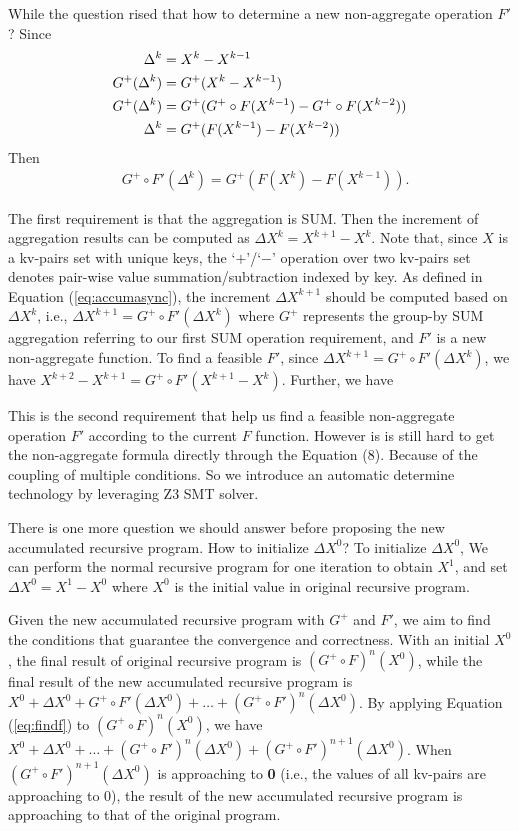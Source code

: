 {While the question rised that how to determine a new non-aggregate operation $F'$? Since
	\begin{equation}
	\label{eq:inferr}
	\begin{aligned}
	\Delta^k&=X^k-X^{k-1}\\
	G^+(\Delta^{k})&=G^+(X^k-X^{k-1})\\
	G^+(\Delta^{k})&=G^+(G^+\circ F(X^{k-1})-G^+\circ F(X^{k-2}))\\
	\Delta^{k}&=G^+(F(X^{k-1})-F(X^{k-2}))\notag
	\end{aligned}
	\end{equation}
	Then
	\begin{equation}
	\label{eq:findf}
	\begin{aligned}
	&G^+\circ F'(\Delta^{k})=G^+(F(X^{k})-F(X^{k-1})).
	\end{aligned}
	\end{equation}
}

{\color{green}
	The first requirement is that the aggregation is SUM. Then the increment of aggregation results can be computed as $\Delta X^k=X^{k+1}-X^k$. Note that, since $X$ is a kv-pairs set with unique keys, the `$+$'/`$-$' operation over two kv-pairs set denotes pair-wise value summation/subtraction indexed by key. As defined in Equation (\ref{eq:accumasync}), the increment $\Delta X^{k+1}$ should be computed based on $\Delta X^k$, i.e., $\Delta X^{k+1}=G^{+}\circ F'(\Delta X^k)$ where $G^{+}$ represents the group-by SUM aggregation referring to our first SUM operation requirement, and $F'$ is a new non-aggregate function. To find a feasible $F'$, since $\Delta X^{k+1}=G^{+}\circ F'(\Delta X^k)$, we have $X^{k+2}-X^{k+1}=G^{+}\circ F'(X^{k+1}-X^k)$. Further, we have
}

This is the second requirement that help us find a feasible non-aggregate operation $F'$ according to the current $F$ function. However is is still hard to get the non-aggregate formula directly through the Equation (8). Because of the coupling of multiple conditions. So we introduce an automatic determine technology by leveraging Z3 SMT solver.
{\color{green} There is one more question we should answer before proposing the new accumulated recursive program. How to initialize $\Delta X^0$? To initialize $\Delta X^0$,  We can perform the normal recursive program for one iteration to obtain $X^1$, and set $\Delta X^0=X^1-X^0$ where $X^0$ is the initial value in original recursive program.
	
	Given the new accumulated recursive program with $G^+$ and $F'$, we aim to find the conditions that guarantee the convergence and correctness. With an initial $X^0$, the final result of original recursive program is $(G^{+}\circ F)^n(X^0)$, while the final result of the new accumulated recursive program is $X^0+\Delta X^0+G^+\circ F'(\Delta X^0)+\ldots+(G^+\circ F')^n(\Delta X^0)$. By applying Equation (\ref{eq:findf}) to $(G^{+}\circ F)^n(X^0)$, we have $X^0+\Delta X^0+\ldots+(G^+\circ F')^n(\Delta X^0)+(G^+\circ F')^{n+1}(\Delta X^0)$. When $(G^+\circ F')^{n+1}(\Delta X^0)$ is approaching to \textbf{0} (i.e., the values of all kv-pairs are approaching to 0), the result of the new accumulated recursive program is approaching to that of the original program.
}

